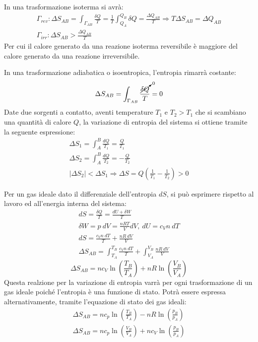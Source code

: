 \documentclass{article}
\numberwithin{equation}{subsection}
\begin{document}
In una trasformazione isoterma si avrà:
\begin{gather*}
    \Gamma_{{rev}}:\Delta S_{AB}=\displaystyle\int_{\Gamma_{AB}}\frac{\delta Q}{T}=\frac{1}{T}\int_{Q_A}^{Q_B}\delta Q=\frac{\Delta Q_{AB}}{T}\Rightarrow T\Delta S_{AB}=\Delta Q_{AB}\\
    \Gamma_{{irr}}:\Delta S_{AB}>\frac{\Delta Q_{AB}}{T}
\end{gather*}
Per cui il calore generato da una reazione isoterma reversibile è maggiore del calore generato da una reazione irreversibile. 


In una trasformazione adiabatica o isoentropica, l'entropia rimarrà costante:
\begin{equation*}
    \Delta S_{AB}=\displaystyle\int_{\Gamma_{AB}}\frac{\cancelto{0}{\delta Q}}{T}=0
\end{equation*}
Date due sorgenti a contatto, aventi temperature $T_1$ e $T_2>T_1$ che si scambiano una quantità di calore $Q$, la variazione di entropia del 
sistema si ottiene tramite la seguente espressione: 
\begin{gather*}
    \Delta S_1=\displaystyle\int_{A}^B\frac{dQ}{T_1}=\frac{Q}{T_1}\\
    \Delta S_2=\displaystyle\int_{A}^B\frac{dQ}{T_2}=-\frac{Q}{T_2}\\
    |\Delta S_2|<\Delta S_1\Rightarrow\Delta S=Q\left(\displaystyle\frac{1}{T_1}-\frac{1}{T_2}\right)>0
\end{gather*}

Per un gas ideale dato il differenziale dell'entropia $dS$, si può esprimere rispetto al lavoro ed all'energia interna del sistema:
\begin{gather*}
    dS=\displaystyle\frac{\delta Q}{T}=\frac{dU+\delta W}{T}\\
    \delta  W=p\:dV=\displaystyle\frac{nRT}{V}dV,\:dU=c_Vn\:dT\\
    dS=\displaystyle\frac{c_Vn\:dT}{T}+\frac{nR\:dV}{V}\\
    \Delta S_{AB}=\int_{T_A}^{T_B}\displaystyle\frac{c_Vn\:dT}{T}+\int_{V_A}^{V_B}\frac{nR\:dV}{V}
\end{gather*} 
\begin{equation}
    \Delta S_{AB}=nc_V\ln\left(\displaystyle\frac{T_B}{T_A}\right)+nR\ln\left(\frac{V_B}{V_A}\right)
\end{equation}
Questa realzione per la variazione di entropia varrà per ogni trasformazione di un gas ideale poiché l'entropia è una funzione di stato. Potrà essere espressa 
alternativamente, tramite l'equazione di stato dei gas ideali:
\begin{gather}
    \Delta S_{AB}=nc_p\ln\left(\displaystyle\frac{T_B}{T_A}\right)-nR\ln\left(\displaystyle\frac{p_B}{p_A}\right)\\
    \Delta S_{AB}=nc_p\ln\left(\displaystyle\frac{V_B}{V_A}\right)+nc_V\ln\left(\frac{p_B}{p_A}\right)
\end{gather}
\end{document}
